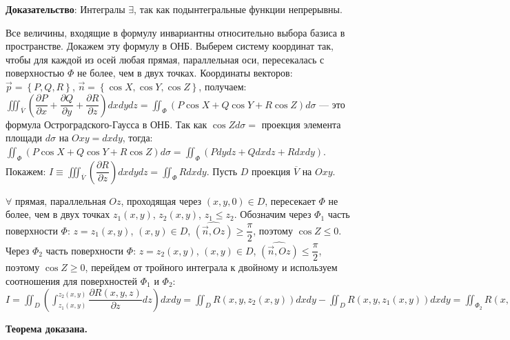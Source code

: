 \par \textbf{Доказательство}: Интегралы $\exists$, так как подынтегральные функции непрерывны.
\par Все величины, входящие в формулу инвариантны относительно выбора базиса в пространстве. Докажем эту формулу в ОНБ. Выберем систему координат так, чтобы для каждой из осей любая прямая, параллельная оси, пересекалась с поверхностью $\Phi$ не более, чем в двух точках. Координаты векторов: $\overrightarrow{p}=\left\{ P,Q,R\right\}$, $\overrightarrow{n}=\left\{ \cos X,\cos Y,\cos Z\right\}$, получаем: $\iiint _{\overline{V}}\left( \dfrac{\partial P}{\partial x}+\dfrac{\partial Q}{\partial y}+\dfrac{\partial R}{\partial z}\right) dxdydz=\iint _{\Phi }(P\cos X+Q\cos Y+R\cos Z)d\sigma$ --- это формула Остроградского-Гаусса в ОНБ. Так как $\cos Zd\sigma=$ проекция элемента площади $d\sigma$ на $Oxy=dxdy$, тогда: $\iint _{\Phi }(P\cos X+Q\cos Y+R\cos Z)d\sigma=\iint _{\Phi }(Pdydz+Qdxdz+Rdxdy)$. Покажем: $I\equiv \iiint _{\overline{V}}\left( \dfrac{\partial R}{\partial z}\right)dxdydz=\iint _{\Phi }Rdxdy$. Пусть $D$ проекция $\overline{V}$ на $Oxy$.
\par $\forall$ прямая, параллельная $Oz$, проходящая через $\left( x,y,0\right)\in D$, пересекает $\Phi$ не более, чем в двух точках $z_{1}\left( x,y\right)$, $z_{2}\left( x,y\right)$, $z_{1}\leq z_{2}$. Обозначим через $\Phi _{1}$ часть поверхности $\Phi$: $z=z_{1}\left( x,y\right)$, $\left( x,y\right) \in D$, $\widehat{\left( \overrightarrow{n},Oz\right)}\geq\dfrac{\pi }{2}$,
поэтому $\cos Z \leq 0 $. Через $\Phi _{2}$ часть поверхности $\Phi$: $z=z_{2}\left( x,y\right)$, $\left( x,y\right) \in D$, $\widehat{\left( \overrightarrow{n},Oz\right)}\leq\dfrac{\pi }{2}$, поэтому $\cos Z \geq 0 $, перейдем от тройного интеграла к двойному и используем соотношения для поверхностей $\Phi _{1}$ и $\Phi _{2}$: $I=\iint _{D}\left( \int ^{z_{2}\left( x,y\right)}_{z_{1}\left( x,y\right)}\dfrac{\partial R\left( x,y,z\right)}{\partial z}dz\right)dxdy=\iint _{D}R\left( x,y,z_{2}\left( x,y\right) \right)dxdy-\iint _{D}R\left( x,y,z_{1}\left( x,y\right) \right)dxdy=\iint _{\Phi _{2}}R\left( x,y,z \right)\cos Z d\sigma-(-\iint _{\Phi _{1}}R\left( x,y,z \right)\cos Z d\sigma)=\iint _{\Phi _{2}}R\left( x,y,z \right)dxdy+\iint _{\Phi _{1}}R\left( x,y,z \right)dxdy=\iint _{\Phi}R\left( x,y,z \right)dxdy$

\textbf{Теорема доказана.}

